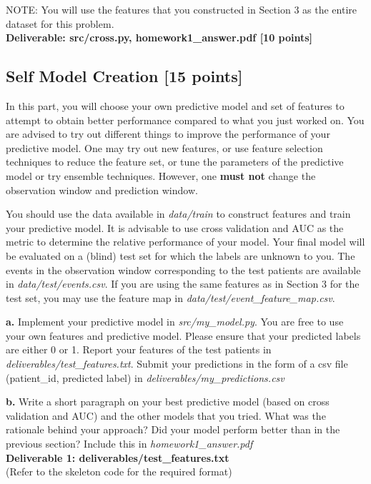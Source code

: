 \documentclass[12pt]{article}
\begin{document}
NOTE: You will use the features that you constructed in Section 3 as the entire dataset for this problem. \\

\textbf{Deliverable: src/cross.py, homework1\_answer.pdf [10 points]}

\subsection{Self Model Creation [15 points]}
In this part, you will choose your own predictive model and set of features to attempt to obtain better performance compared to what you just worked on. You are advised to try out different things to improve the performance of your predictive model. One may try out new features, or use feature selection techniques to reduce the feature set, or tune the parameters of the predictive model or try ensemble techniques. However, one \textbf{must not} change the observation window and prediction window. 

You should use the data available in \textit{data/train} to construct features and train your predictive model. It is advisable to use cross validation and AUC as the metric to determine the relative performance of your model. Your final model will be evaluated on a (blind) test set for which the labels are unknown to you. The events in the observation window corresponding to the test patients are available in \textit{data/test/events.csv}. If you are using the same features as in Section 3 for the test set, you may use the feature map in \textit{data/test/event\_feature\_map.csv}. 
 
\textbf{a.} Implement your predictive model in \textit{src/my\_model.py}. You are free to use your own features and predictive model. Please ensure that your predicted labels are either 0 or 1. Report your features of the test patients in \textit{deliverables/test\_features.txt}. Submit your predictions in the form of a csv file (patient\_id, predicted label) in  \textit{deliverables/my\_predictions.csv}

\textbf{b.} Write a short paragraph on your best predictive model (based on cross validation and AUC) and the other models that you tried. What was the rationale behind your approach? Did your model perform better than in the previous section? Include this in \textit{homework1\_answer.pdf}\\

\textbf{Deliverable 1: deliverables/test\_features.txt}\\(Refer to the skeleton code for the required format)  
\end{document}
